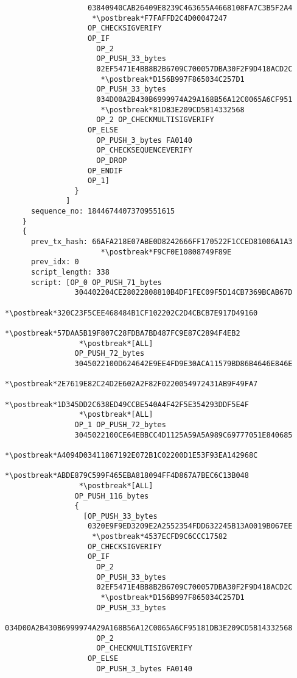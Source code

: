\begin{lstlisting}
                   03840940CAB26409E8239C463655A4668108FA7C3B5F2A4
                    *\postbreak*F7FAFFD2C4D00047247
                   OP_CHECKSIGVERIFY
                   OP_IF
                     OP_2
                     OP_PUSH_33_bytes
                     02EF5471E4BB8B2B6709C700057DBA30F2F9D418ACD2C
                      *\postbreak*D156B997F865034C257D1
                     OP_PUSH_33_bytes
                     034D00A2B430B6999974A29A168B56A12C0065A6CF951
                      *\postbreak*81DB3E209CD5B14332568
                     OP_2 OP_CHECKMULTISIGVERIFY
                   OP_ELSE
                     OP_PUSH_3_bytes FA0140
                     OP_CHECKSEQUENCEVERIFY
                     OP_DROP
                   OP_ENDIF
                   OP_1]
                }
              ]
      sequence_no: 18446744073709551615
    }
    {
      prev_tx_hash: 66AFA218E07ABE0D8242666FF170522F1CCED81006A1A3
                      *\postbreak*F9CF0E10808749F89E
      prev_idx: 0
      script_length: 338
      script: [OP_0 OP_PUSH_71_bytes
                304402204CE28022808810B4DF1FEC09F5D14CB7369BCAB67D
                 *\postbreak*320C23F5CEE468484B1CF102202C2D4CBCB7E917D49160
                 *\postbreak*57DAA5B19F807C28FDBA7BD487FC9E87C2894F4EB2
                 *\postbreak*[ALL]
                OP_PUSH_72_bytes
                3045022100D624642E9EE4FD9E30ACA11579BD86B4646E846E
                 *\postbreak*2E7619E82C24D2E602A2F82F0220054972431AB9F49FA7
                 *\postbreak*1D345DD2C638ED49CCBE540A4F42F5E354293DDF5E4F
                 *\postbreak*[ALL]
                OP_1 OP_PUSH_72_bytes
                3045022100CE64EBBCC4D1125A59A5A989C69777051E840685
                 *\postbreak*A4094D03411867192E072B1C02200D1E53F93EA142968C
                 *\postbreak*ABDE879C599F465EBA818094FF4D867A7BEC6C13B048
                 *\postbreak*[ALL]
                OP_PUSH_116_bytes
                {
                  [OP_PUSH_33_bytes
                   0320E9F9ED3209E2A2552354FDD632245B13A0019B067EE
                    *\postbreak*4537ECFD9C6CCC17582
                   OP_CHECKSIGVERIFY
                   OP_IF
                     OP_2
                     OP_PUSH_33_bytes
                     02EF5471E4BB8B2B6709C700057DBA30F2F9D418ACD2C
                      *\postbreak*D156B997F865034C257D1
                     OP_PUSH_33_bytes
                     034D00A2B430B6999974A29A168B56A12C0065A6CF95181DB3E209CD5B14332568
                     OP_2
                     OP_CHECKMULTISIGVERIFY
                   OP_ELSE
                     OP_PUSH_3_bytes FA0140

\end{lstlisting}
